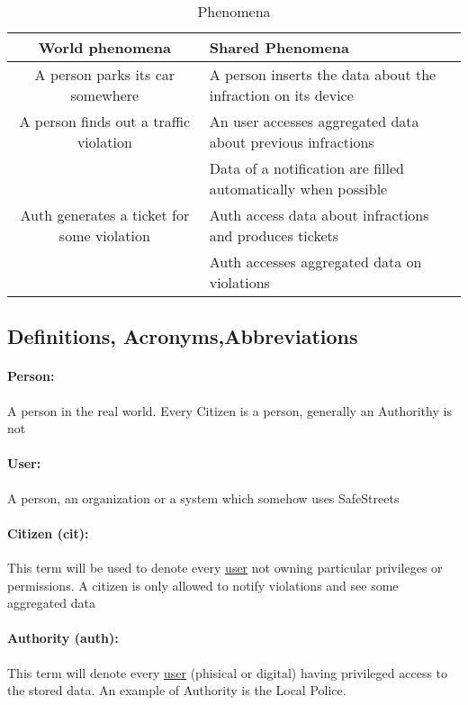 \documentclass{article}
\begin{document}
		\begin{table}[h]
			\begin{center}
				\caption{Phenomena}
				\small
				\label{Phenomena}
				\begin{tabular}{c|l}
					\textbf{World phenomena}&\textbf{Shared Phenomena}\\
					\hline
					A person parks its car somewhere&A person inserts the data about the infraction on its device\\
					A person finds out a traffic violation&An user accesses aggregated data about previous infractions\\
						&Data of a notification are filled automatically when possible\\
					\hline
					Auth generates a ticket for some violation&Auth access data about infractions and produces tickets\\
					&Auth accesses aggregated data on violations\\
					
				\end{tabular}
			\end{center}
		\end{table}
		
	\subsection{Definitions, Acronyms,Abbreviations} \label{definitions}
		\paragraph{Person:}A person in the real world. Every Citizen is a person, generally an Authorithy is not
		\paragraph{User:}A person, an organization or a system which somehow uses SafeStreets
		\paragraph{Citizen (cit):} This term will be used to denote every \underline{user} not owning particular privileges or permissions. A citizen is only allowed to notify violations and see some aggregated data
		\paragraph{Authority (auth):} This term will denote every \underline{user} (phisical or digital) having privileged access to the stored data. An example of Authority is the Local Police.
\end{document}
